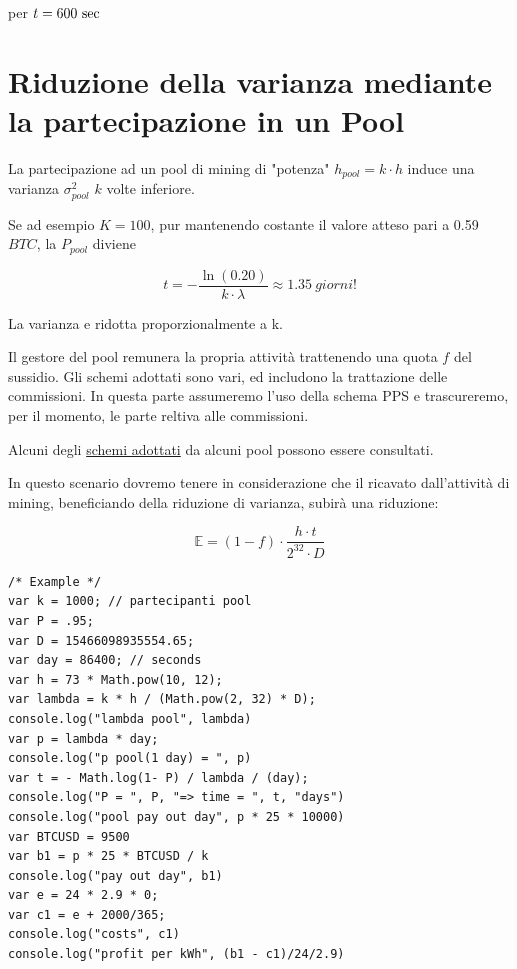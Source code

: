 \documentclass{book}
\theoremstyle{definition}
\begin{document}
per $t = 600 \ \textnormal{sec}$

\section{Riduzione della varianza mediante la partecipazione in un Pool}

La partecipazione ad un pool di mining di "potenza" $h_{\textit{pool}} = k \cdot h$ induce una varianza $\sigma_{\textit{pool}}^{2}$ $k$ volte inferiore.

Se ad esempio $K = 100$, pur mantenendo costante il valore atteso pari a 0.59 $BTC$, la $P_{pool}$ diviene

\begin{equation}
    t = -\frac{\ln(0.20)}{k \cdot \lambda} \approx 1.35 \ \textit{giorni!} 
\end{equation}

La varianza e ridotta proporzionalmente a k.

Il gestore del pool remunera la propria attività trattenendo una quota $f$ del sussidio. Gli schemi adottati sono vari, ed includono la trattazione delle commissioni. 
In questa parte assumeremo l'uso della schema PPS e trascureremo, per il momento, le parte reltiva alle commissioni.

Alcuni degli \href{https://en.bitcoin.it/wiki/Comparison_of_mining_pools}{schemi adottati} da alcuni pool possono essere consultati.

In questo scenario dovremo tenere in considerazione che il ricavato dall'attività di mining, beneficiando della riduzione di varianza,
subirà una riduzione:

\begin{equation}
    \mathbb{E} = (1 - f) \cdot \frac{h \cdot t}{2^{32} \cdot D} \label{adjusted_lambda}
\end{equation}

\lstset{style=mystyle}
\begin{lstlisting}[language=VBScript]
/* Example */
var k = 1000; // partecipanti pool
var P = .95;
var D = 15466098935554.65;
var day = 86400; // seconds
var h = 73 * Math.pow(10, 12);
var lambda = k * h / (Math.pow(2, 32) * D);
console.log("lambda pool", lambda)
var p = lambda * day;
console.log("p pool(1 day) = ", p)
var t = - Math.log(1- P) / lambda / (day);
console.log("P = ", P, "=> time = ", t, "days")
console.log("pool pay out day", p * 25 * 10000)
var BTCUSD = 9500
var b1 = p * 25 * BTCUSD / k
console.log("pay out day", b1)
var e = 24 * 2.9 * 0;
var c1 = e + 2000/365;
console.log("costs", c1)
console.log("profit per kWh", (b1 - c1)/24/2.9)
\end{lstlisting}
\end{document}
